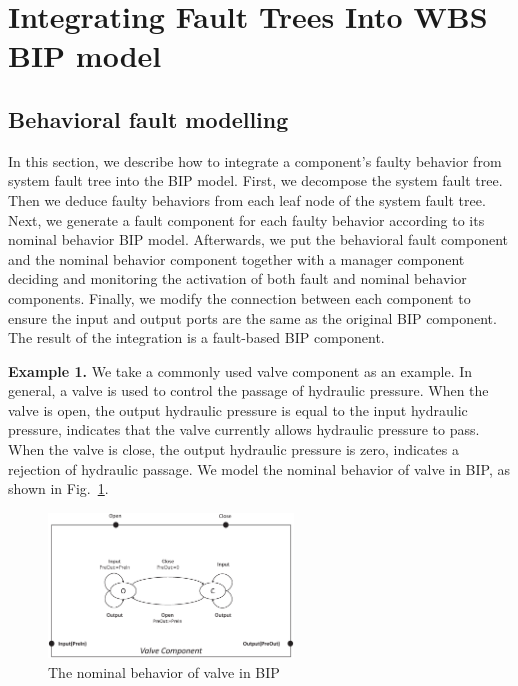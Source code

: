 

\section{Integrating Fault Trees Into WBS BIP model}

\subsection{Behavioral fault modelling}
In this section, we describe how to integrate a component's faulty behavior from system fault tree\cite{ft} into the BIP model. First, we decompose the system fault tree. Then we deduce faulty behaviors from each leaf node of the system fault tree. Next, we generate a fault component for each faulty behavior according to its nominal behavior BIP model. Afterwards, we put the behavioral fault component and the nominal behavior component together with a manager component deciding and monitoring the activation of both fault and nominal behavior components. Finally, we modify the connection between each component to ensure the input and output ports are the same as the original BIP component. The result of the integration is a fault-based BIP component.


\textbf{Example 1.} We take a commonly used valve component as an example. In general, a valve is used to control the passage of hydraulic pressure. When the valve is open, the output hydraulic pressure is equal to the input hydraulic pressure, indicates that the valve currently allows hydraulic pressure to pass. When the valve is close, the output hydraulic pressure is zero, indicates a rejection of hydraulic passage. We model the nominal behavior of valve in BIP, as shown in Fig.~\ref{example_BIP_nominal}.

\begin{figure}[t]
	\centerline{\includegraphics[width=65mm]{figure/example_origin.eps}}
	\caption{The nominal behavior of valve in BIP}
	\label{example_BIP_nominal}
\end{figure}

